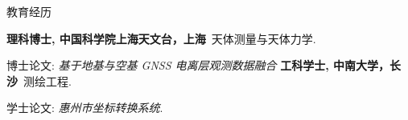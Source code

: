 \begin{rubric}{教育经历}

\entry*[2014 -- 2020]%
	\textbf{理科博士, 中国科学院上海天文台，上海}~天体测量与天体力学.
	\par 博士论文: \emph{基于地基与空基 GNSS 电离层观测数据融合}
%
\entry*[2010 -- 2014]%
	\textbf{工科学士, 中南大学，长沙}~测绘工程.
	\par 学士论文: \emph{惠州市坐标转换系统}.
\end{rubric}